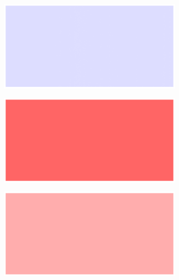 \begin{figure}[!h]
\begin{subfigure}{0.33\textwidth}
    \end{subfigure}
    
    \vspace{1em}
    
    \begin{subfigure}{0.33\textwidth}
        \includegraphics[width=\textwidth]{figures/anomalies/ae/20190415_031735.png}
    \end{subfigure}%
    \hfill
    \begin{subfigure}{0.33\textwidth}
        \includegraphics[width=\textwidth]{figures/anomalies/ae/20190415_031750.png}
    \end{subfigure}%
    \hfill
    \begin{subfigure}{0.33\textwidth}
        \includegraphics[width=\textwidth]{figures/anomalies/ae/20190415_031755.png}
    \end{subfigure}
    

\end{figure}
